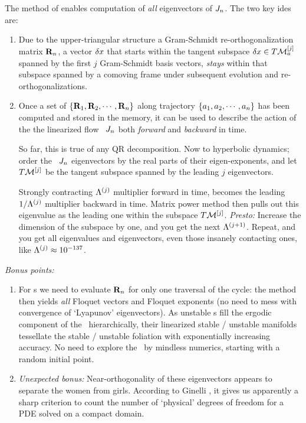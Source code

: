 The method of  enables computation of
{\em all} eigenvectors of $J_n$. The two key ides are:
\begin{enumerate}
  \item
Due to the upper-triangular structure a Gram-Schmidt
re-orthogonalization matrix ${\bf R}_n$, a vector ${\delta x}$
that starts within the tangent subspace ${\delta x} \in
T{\cal M}_{a}^{[j]}$ spanned by the first $j$ Gram-Schmidt basis
vectors, {\em stays} within that subspace spanned by a comoving
frame under subsequent evolution and re-orthogonalizations.
\item Once a set of $\{{\bf R}_1,{\bf R}_2,\cdots,{\bf R}_n\}$
along trajectory $\{a_1,a_2,\cdots,a_n\}$ has been
computed and stored in the memory, it can be used to describe
the action of the the linearized flow \jacobianM\ $J_n$
both \emph{forward} and \emph{backward} in time.

So far, this is true of any QR decomposition. Now to
hyperbolic dynamics; order the \jacobianM\ $J_n$
eigenvectors \jEigvec[\ell] by the real parts of their
eigen-exponents, and let $T{\cal M}^{[j]}$ be the tangent
subspace spanned by the leading $j$ eigenvectors.

Strongly contracting $\Lambda^{(j)}$ multiplier forward in
time, becomes the leading $1/\Lambda^{(j)}$ multiplier
backward in time. Matrix power method then pulls out this
eigenvalue as the leading one within the subspace
$T{\cal M}^{[j]}$. \emph{Presto:} Increase the dimension of the
subspace by one, and you get the next $\Lambda^{(j+1)}$.
Repeat, and you get all eigenvalues and eigenvectors, even
those insanely contacting ones, like $\Lambda^{(j)}
\approx 10^{-137}$.

\end{enumerate}
\emph{Bonus points:}
\begin{enumerate}
  \item For {\po s} we need to evaluate ${\bf R}_n$ for
  only one traversal of the cycle: the method then yields {\em
  all} Floquet vectors and Floquet exponents (no need to mess
  with convergence of `Lyapunov' eigenvectors). As unstable \po
  s fill the ergodic component of the \statesp\ hierarchically,
  their linearized stable / unstable manifolds tessellate the
  stable / unstable foliation with exponentially increasing
  accuracy. No need to explore the \statesp\ by mindless
  numerics, starting with a random initial point.

  \item \emph{Unexpected bonus:} Near-orthogonality of
      these eigenvectors appears to separate the women from
      girls. According to Ginelli
      \etal{}, it gives us apparently a
      sharp criterion to count the number of `physical'
      degrees of freedom for a PDE solved on a compact
      domain.
\end{enumerate}

